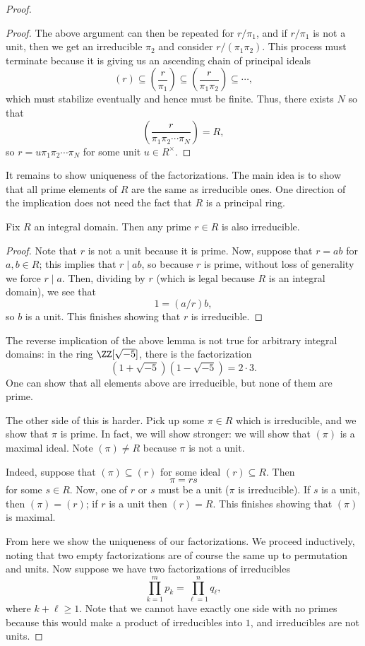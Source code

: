 \begin{proof}
\begin{proof}
		The above argument can then be repeated for $r/\pi_1$, and if $r/\pi_1$ is not a unit, then we get an irreducible $\pi_2$ and consider $r/(\pi_1\pi_2)$. This process must terminate because it is giving us an ascending chain of principal ideals
		\[(r)\subseteq\left(\frac r{\pi_1}\right)\subseteq\left(\frac r{\pi_1\pi_2}\right)\subseteq\cdots,\]
		which must stabilize eventually and hence must be finite. Thus, there exists $N$ so that
		\[\left(\frac r{\pi_1\pi_2\cdots\pi_N}\right)=R,\]
		so $r=u\pi_1\pi_2\cdots\pi_N$ for some unit $u\in R^\times$.
	\end{proof}
	It remains to show uniqueness of the factorizations. The main idea is to show that all prime elements of $R$ are the same as irreducible ones. One direction of the implication does not need the fact that $R$ is a principal ring.
	\begin{lemma}
		Fix $R$ an integral domain. Then any prime $r\in R$ is also irreducible.
	\end{lemma}
	\begin{proof}
		Note that $r$ is not a unit because it is prime. Now, suppose that $r=ab$ for $a,b\in R$; this implies that $r\mid ab$, so because $r$ is prime, without loss of generality we force $r\mid a$. Then, dividing by $r$ (which is legal because $R$ is an integral domain), we see that
		\[1=(a/r)b,\]
		so $b$ is a unit. This finishes showing that $r$ is irreducible.
	\end{proof}
	\begin{warn}
		The reverse implication of the above lemma is not true for arbitrary integral domains: in the ring $\ZZ[\sqrt{-5}]$, there is the factorization
		\[\left(1+\sqrt{-5}\right)\left(1-\sqrt{-5}\right)=2\cdot3.\]
		One can show that all elements above are irreducible, but none of them are prime.
	\end{warn}
	The other side of this is harder. Pick up some $\pi\in R$ which is irreducible, and we show that $\pi$ is prime. In fact, we will show stronger: we will show that $(\pi)$ is a maximal ideal. Note $(\pi)\ne R$ because $\pi$ is not a unit.
	
	Indeed, suppose that $(\pi)\subseteq(r)$ for some ideal $(r)\subseteq R$. Then
	\[\pi=rs\]
	for some $s\in R$. Now, one of $r$ or $s$ must be a unit ($\pi$ is irreducible). If $s$ is a unit, then $(\pi)=(r)$; if $r$ is a unit then $(r)=R$. This finishes showing that $(\pi)$ is maximal.

	From here we show the uniqueness of our factorizations. We proceed inductively, noting that two empty factorizations are of course the same up to permutation and units. Now suppose we have two factorizations of irreducibles
	\[\prod_{k=1}^mp_k=\prod_{\ell=1}^nq_\ell,\]
	where $k+\ell\ge1$. Note that we cannot have exactly one side with no primes because this would make a product of irreducibles into $1$, and irreducibles are not units.


\end{proof}

